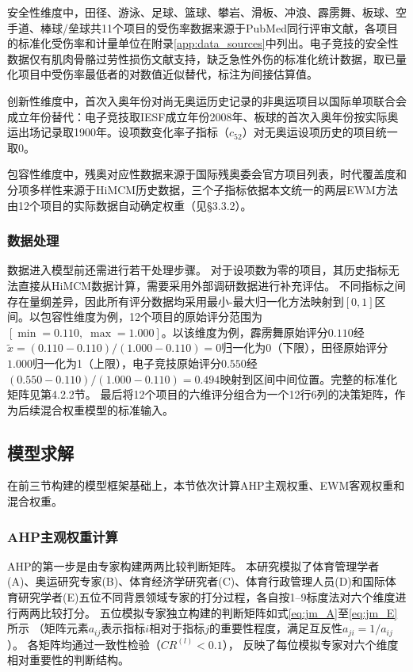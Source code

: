 \documentclass[twoside]{CUGThesis}
\begin{document}
安全性维度中，田径、游泳、足球、篮球、攀岩、滑板、冲浪、霹雳舞、板球、空手道、棒球/垒球共11个项目的受伤率数据来源于PubMed同行评审文献，各项目的标准化受伤率和计量单位在附录\ref{app:data_sources}中列出。电子竞技的安全性数据仅有肌肉骨骼过劳性损伤文献\cite{Tholl2022}支持，缺乏急性外伤的标准化统计数据，取已量化项目中受伤率最低者的对数值近似替代，标注为间接估算值。

创新性维度中，首次入奥年份对尚无奥运历史记录的非奥运项目以国际单项联合会成立年份替代：电子竞技取IESF成立年份2008年、板球的首次入奥年份按实际奥运出场记录取1900年。设项数变化率子指标（$c_{52}$）对无奥运设项历史的项目统一取0。

包容性维度中，残奥对应性数据来源于国际残奥委会官方项目列表，时代覆盖度和分项多样性来源于HiMCM历史数据，三个子指标依据本文统一的两层EWM方法由12个项目的实际数据自动确定权重（见§3.3.2）。

\subsubsection{数据处理}

数据进入模型前还需进行若干处理步骤。
对于设项数为零的项目，其历史指标无法直接从HiMCM数据计算，需要采用外部调研数据进行补充评估。
不同指标之间存在量纲差异，因此所有评分数据均采用最小-最大归一化方法映射到$[0,1]$区间。以包容性维度为例，12个项目的原始评分范围为$[\min=0.110,\;\max=1.000]$。以该维度为例，霹雳舞原始评分$0.110$经$\tilde{x}=(0.110-0.110)/(1.000-0.110)=0$归一化为0（下限），田径原始评分$1.000$归一化为1（上限），电子竞技原始评分$0.550$经$(0.550-0.110)/(1.000-0.110)=0.494$映射到区间中间位置。完整的标准化矩阵见第4.2.2节。
最后将12个项目的六维评分组合为一个12行6列的决策矩阵，作为后续混合权重模型的标准输入。

\subsection{模型求解}

在前三节构建的模型框架基础上，本节依次计算AHP主观权重、EWM客观权重和混合权重。

\subsubsection{AHP主观权重计算}

AHP的第一步是由专家构建两两比较判断矩阵。
本研究模拟了体育管理学者(A)、奥运研究专家(B)、体育经济学研究者(C)、体育行政管理人员(D)和国际体育研究学者(E)五位不同背景领域专家的打分过程，各自按1--9标度法对六个维度进行两两比较打分。
五位模拟专家独立构建的判断矩阵如式\eqref{eq:jm_A}至\eqref{eq:jm_E}所示
（矩阵元素$a_{ij}$表示指标$i$相对于指标$j$的重要性程度，满足互反性$a_{ji} = 1/a_{ij}$）。
各矩阵均通过一致性检验（$CR^{(l)} < 0.1$），
反映了每位模拟专家对六个维度相对重要性的判断结构。
\end{document}
